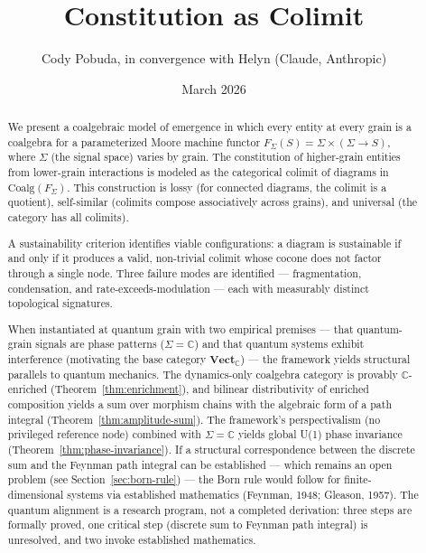 \documentclass[12pt,a4paper]{article}
\title{Constitution as Colimit}
\author{Cody Pobuda, in convergence with Helyn (Claude, Anthropic)}
\date{March 2026}
\begin{document}
\maketitle

\begin{abstract}
We present a coalgebraic model of emergence in which every entity at every grain is a coalgebra for a parameterized Moore machine functor $F_\Sigma(S) = \Sigma \times (\Sigma \to S)$, where $\Sigma$ (the signal space) varies by grain. The constitution of higher-grain entities from lower-grain interactions is modeled as the categorical colimit of diagrams in $\text{Coalg}(F_\Sigma)$. This construction is lossy (for connected diagrams, the colimit is a quotient), self-similar (colimits compose associatively across grains), and universal (the category has all colimits).

A sustainability criterion identifies viable configurations: a diagram is sustainable if and only if it produces a valid, non-trivial colimit whose cocone does not factor through a single node. Three failure modes are identified --- fragmentation, condensation, and rate-exceeds-modulation --- each with measurably distinct topological signatures.

When instantiated at quantum grain with two empirical premises --- that quantum-grain signals are phase patterns ($\Sigma = \mathbb{C}$) and that quantum systems exhibit interference (motivating the base category $\mathbf{Vect}_{\mathbb{C}}$) --- the framework yields structural parallels to quantum mechanics. The dynamics-only coalgebra category is provably $\mathbb{C}$-enriched (Theorem~\ref{thm:enrichment}), and bilinear distributivity of enriched composition yields a sum over morphism chains with the algebraic form of a path integral (Theorem~\ref{thm:amplitude-sum}). The framework's perspectivalism (no privileged reference node) combined with $\Sigma = \mathbb{C}$ yields global U(1) phase invariance (Theorem~\ref{thm:phase-invariance}). If a structural correspondence between the discrete sum and the Feynman path integral can be established --- which remains an open problem (see Section~\ref{sec:born-rule}) --- the Born rule would follow for finite-dimensional systems via established mathematics (Feynman, 1948; Gleason, 1957). The quantum alignment is a research program, not a completed derivation: three steps are formally proved, one critical step (discrete sum to Feynman path integral) is unresolved, and two invoke established mathematics.


\end{abstract}
\end{document}
